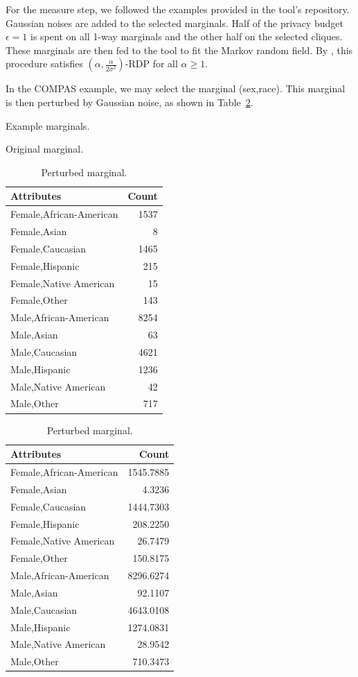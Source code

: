 \documentclass[manuscript,screen,review,anonymous]{acmart}
\begin{document}
For the measure step, we followed the examples provided in the tool's repository. Gaussian noises are added to the selected marginals. Half of the privacy budget $\epsilon = 1$ is spent on all 1-way marginals and the other half on the selected cliques. These marginals are then fed to the tool to fit the Markov random field. By \cite{mckenna2021winning}, this procedure satisfies $(\alpha,\frac{\alpha}{2 \sigma^2})$-RDP for all $\alpha \geq 1$.

In the COMPAS example, we may select the marginal (sex,race). This marginal is then perturbed by Gaussian noise, as shown in Table~\ref{tab:marginal-perturbed}.

\begin{table}[h]
\caption{Example marginals.}
\label{tab:marginal-perturbed}
\centering
\begin{subtable}[t]{0.45\linewidth}
\centering
\caption{Original marginal.}
\begin{tabular}{lr}
\toprule
Attributes & Count \\
\midrule
Female,African-American & 1537 \\
Female,Asian & 8 \\
Female,Caucasian & 1465 \\
Female,Hispanic & 215 \\
Female,Native American & 15 \\
Female,Other & 143 \\
Male,African-American & 8254 \\
Male,Asian & 63 \\
Male,Caucasian & 4621 \\
Male,Hispanic & 1236 \\
Male,Native American & 42 \\
Male,Other & 717 \\
\bottomrule
\end{tabular}
\end{subtable}
\begin{subtable}[t]{0.45\linewidth}
\centering
\caption{Perturbed marginal.}
\begin{tabular}{lr}
\toprule
Attributes & Count \\
\midrule
Female,African-American & 1545.7885 \\
Female,Asian & 4.3236 \\
Female,Caucasian & 1444.7303 \\
Female,Hispanic & 208.2250 \\
Female,Native American & 26.7479 \\
Female,Other & 150.8175 \\
Male,African-American & 8296.6274 \\
Male,Asian & 92.1107 \\
Male,Caucasian & 4643.0108 \\
Male,Hispanic & 1274.0831 \\
Male,Native American & 28.9542 \\
Male,Other & 710.3473 \\
\bottomrule
\end{tabular}
\end{subtable}
\end{table}
\end{document}
